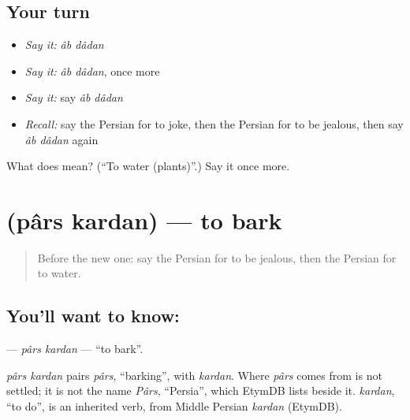 \subsection*{Your turn}
\begin{itemize}
\raggedright
  \item \emph{Say it:} \emph{âb dâdan}
  \item \emph{Say it:} \emph{âb dâdan}, once more
  \item \emph{Say it:} say \emph{âb dâdan}
  \item \emph{Recall:} say the Persian for to joke, then the Persian for to be jealous, then say \emph{âb dâdan} again
\end{itemize}

\begin{tcolorbox}[breakable,colback=teal!4,colframe=teal!35!black,title={Before you move on}]
What does   mean? (\textquotedblleft{}To water (plants)\textquotedblright{}.) Say it once more.
\end{tcolorbox}
\section[\texorpdfstring{\fa{پارس} \fa{کردن} (pârs kardan)}{پارس کردن (pârs kardan)}]{  (pârs kardan) — to bark}

\label{lesson:FA-C222-pars-kardan}



\begin{quote}
Before the new one: say the Persian for to be jealous, then the Persian for to water.
\end{quote}

\subsection*{You'll want to know:  }
\textbf{ } — \emph{pârs kardan} — \textquotedblleft{}to bark\textquotedblright{}.

\begin{cousinweb}
\emph{pârs kardan} pairs \emph{pârs}, \textquotedblleft{}barking\textquotedblright{}, with \emph{kardan}. Where \emph{pârs} comes from is not settled; it is not the name \emph{Pârs}, \textquotedblleft{}Persia\textquotedblright{}, which EtymDB lists beside it. \emph{kardan}, \textquotedblleft{}to do\textquotedblright{}, is an inherited verb, from Middle Persian \emph{kardan} (EtymDB).
\end{cousinweb}

